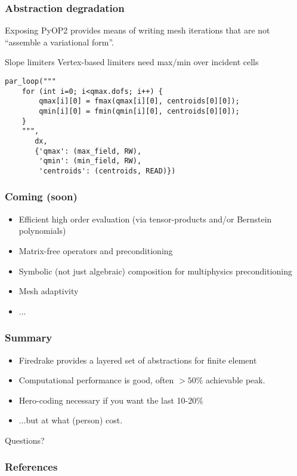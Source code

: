 \documentclass[presentation]{beamer}
\begin{document}
\begin{frame}[fragile]
  \frametitle{Abstraction degradation}
  Exposing PyOP2 provides means of writing mesh iterations that are
  not ``assemble a variational form''.

  \begin{exampleblock}{Slope limiters}
    Vertex-based limiters need max/min over incident cells
\begin{verbatim}
par_loop("""
    for (int i=0; i<qmax.dofs; i++) {
        qmax[i][0] = fmax(qmax[i][0], centroids[0][0]);
        qmin[i][0] = fmin(qmin[i][0], centroids[0][0]);
    }
    """,
       dx,
       {'qmax': (max_field, RW),
        'qmin': (min_field, RW),
        'centroids': (centroids, READ)})
\end{verbatim}
  \end{exampleblock}
\end{frame}

\begin{frame}
  \frametitle{Coming (soon)}
  \begin{itemize}
  \item Efficient high order evaluation (via tensor-products and/or
    Bernstein polynomials)
  \item Matrix-free operators and preconditioning
  \item Symbolic (not just algebraic) composition for multiphysics
    preconditioning
  \item Mesh adaptivity
  \item ...
  \end{itemize}
\end{frame}

\begin{frame}
  \frametitle{Summary}
  \begin{itemize}
  \item Firedrake provides a layered set of abstractions for finite
    element
  \item Computational performance is good, often $>50\%$ achievable
    peak.
  \item Hero-coding necessary if you want the last 10-20\%
  \item ...but at what (person) cost.
  \end{itemize}
\end{frame}
\begin{frame}[standout]
  Questions?
\end{frame}

\appendix
\begin{frame}[allowframebreaks]
  \frametitle{References}
  \printbibliography[heading=none]
\end{frame}
\end{document}
